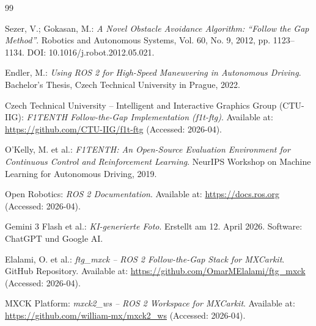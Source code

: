 \documentclass[12pt]{report}
\begin{document}
\begin{thebibliography}{99}

Sezer, V.; Gokasan, M.:
\textit{A Novel Obstacle Avoidance Algorithm: ``Follow the Gap Method''}.
Robotics and Autonomous Systems, Vol. 60, No. 9, 2012, pp. 1123--1134.
DOI: 10.1016/j.robot.2012.05.021.

Endler, M.:
\textit{Using ROS 2 for High-Speed Maneuvering in Autonomous Driving}.
Bachelor’s Thesis, Czech Technical University in Prague, 2022.

Czech Technical University – Intelligent and Interactive Graphics Group (CTU-IIG):
\textit{F1TENTH Follow-the-Gap Implementation (f1t-ftg)}.
Available at: \url{https://github.com/CTU-IIG/f1t-ftg}
(Accessed: 2026-04).

O’Kelly, M. et al.:
\textit{F1TENTH: An Open-Source Evaluation Environment for Continuous Control and Reinforcement Learning}.
NeurIPS Workshop on Machine Learning for Autonomous Driving, 2019.

Open Robotics:
\textit{ROS 2 Documentation}.
Available at: \url{https://docs.ros.org}
(Accessed: 2026-04).

Gemini 3 Flash et al.:
\textit{KI-generierte Foto}.
Erstellt am 12. April 2026.
Software: ChatGPT und Google AI.

Elalami, O. et al.:
\textit{ftg\_mxck – ROS 2 Follow-the-Gap Stack for MXCarkit}.
GitHub Repository.
Available at: \url{https://github.com/OmarMElalami/ftg_mxck}
(Accessed: 2026-04).

MXCK Platform:
\textit{mxck2\_ws – ROS 2 Workspace for MXCarkit}.
Available at: \url{https://github.com/william-mx/mxck2_ws}
(Accessed: 2026-04).

\end{thebibliography}
\end{document}

